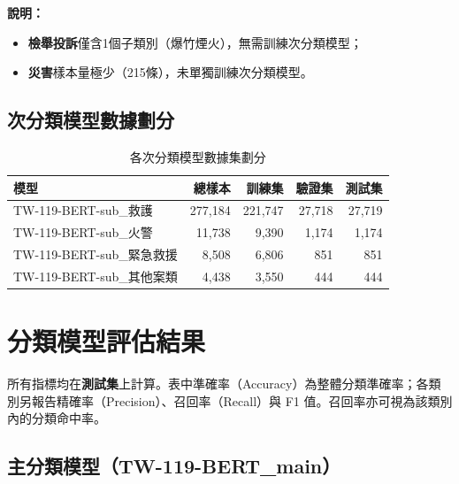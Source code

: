 \documentclass[UTF8,a4paper,11pt]{ctexart}
\begin{document}
\noindent\textbf{說明：}
\begin{itemize}
  \item \textbf{檢舉投訴}僅含1個子類別（爆竹煙火），無需訓練次分類模型；
  \item \textbf{災害}樣本量極少（215條），未單獨訓練次分類模型。
\end{itemize}

\subsection{次分類模型數據劃分}

\begin{table}[htbp]
  \centering
  \caption{各次分類模型數據集劃分}
  \label{tab:sub-split}
  \begin{tabular}{lrrrr}
    \toprule
    模型 & 總樣本 & 訓練集 & 驗證集 & 測試集 \\
    \midrule
    TW-119-BERT-sub\_救護     & 277,184 & 221,747 & 27,718 & 27,719 \\
    TW-119-BERT-sub\_火警     &  11,738 &   9,390 &  1,174 &  1,174 \\
    TW-119-BERT-sub\_緊急救援 &   8,508 &   6,806 &    851 &    851 \\
    TW-119-BERT-sub\_其他案類 &   4,438 &   3,550 &    444 &    444 \\
    \bottomrule
  \end{tabular}
\end{table}

\section{分類模型評估結果}

所有指標均在\textbf{測試集}上計算。表中準確率（Accuracy）為整體分類準確率；各類別另報告精確率（Precision）、召回率（Recall）與 F1 值。召回率亦可視為該類別內的分類命中率。

\subsection{主分類模型（TW-119-BERT\_main）}
\end{document}
